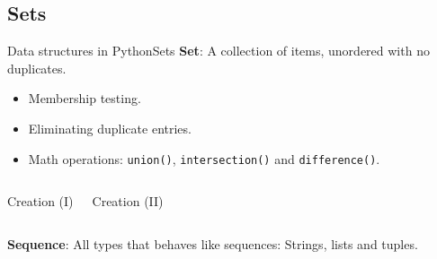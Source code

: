 \documentclass[10pt,compress]{beamer} %
\begin{document}
\subsection{Sets}
\begin{frame}{Data structures in Python}{Sets}
\vspace{-0.2cm}
	\textbf{Set}: A collection of items, unordered with no duplicates.
		\begin{itemize}
		\item \small{Membership testing.}
		\item \small{Eliminating duplicate entries.}
		\item \small{Math operations: \texttt{union()}, \texttt{intersection()} and \texttt{difference()}.}
		\end{itemize}
\vspace{-0.2cm}
    \begin{columns}
 	   \scriptsize{
		\begin{exampleblock}{Creation (I)}
		\vspace{-0.2cm}
		
		
		\vspace{-0.2cm}
		\end{exampleblock}
		}
		

 	  \scriptsize{
 	   \begin{exampleblock}{Creation (II)}
		\vspace{-0.2cm}
		
		
		\vspace{-0.2cm}
		
		\end{exampleblock}
		\vspace{0.3cm}
		}
	\end{columns}
	\vspace{0.1cm}
\small{\textbf{Sequence}: All types that behaves like sequences: Strings, lists and tuples.}
\end{frame}

	

%		
\end{document}
